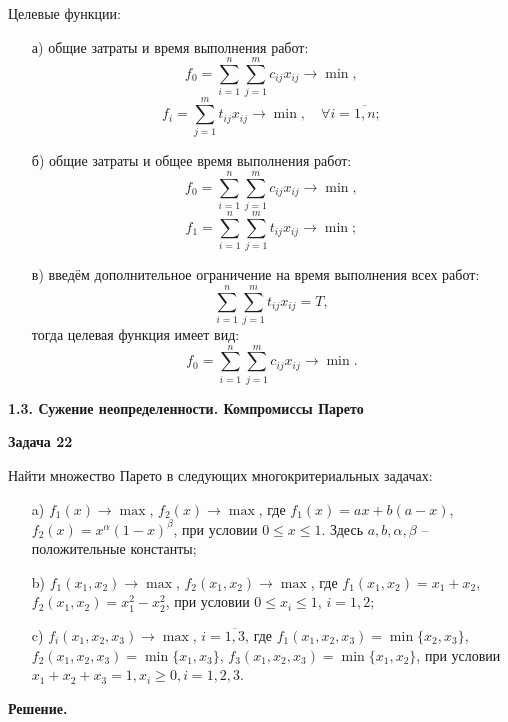 \documentclass[a4paper,14pt]{extreport}
\begin{document}
Целевые функции:
\begin{itemize}
	\item[а)] общие затраты и время выполнения работ:
$$
	f_0 = \sum_{i=1}^n \sum_{j=1}^m c_{ij} x_{ij} \to \min,
$$ $$
	f_i = \sum_{j=1}^m t_{ij} x_{ij} \to \min, \quad \forall i=\overline{1, n};
$$

	\item[б)] общие затраты и общее время выполнения работ:
$$
	f_0 = \sum_{i=1}^n \sum_{j=1}^m c_{ij} x_{ij} \to \min,
$$ $$
	f_1 = \sum_{i=1}^n \sum_{j=1}^m t_{ij} x_{ij} \to \min;
$$

	\item[в)] введём дополнительное ограничение на время выполнения всех работ:
$$
	\sum_{i=1}^n \sum_{j=1}^m t_{ij} x_{ij} = T,
$$
тогда целевая функция имеет вид:
$$
	f_0 = \sum_{i=1}^n \sum_{j=1}^m c_{ij}x_{ij} \to \min.
$$
\end{itemize}

\begin{center}
	\textbf{1.3. Сужение неопределенности. Компромиссы Парето}
\end{center}

\textbf{Задача 22}

Найти множество Парето в следующих многокритериальных задачах:
\begin{itemize}
	\item[a)] $f_1(x) \to \max$, $f_2(x) \to \max$, где $f_1(x) = ax+b(a-x)$, $f_2(x) = x^{\alpha}(1-x)^{\beta}$, при условии $0 \le x \le 1$. Здесь $a, b, \alpha, \beta$ -- положительные константы;

	\item[b)] $f_1(x_1, x_2) \to \max$, $f_2(x_1, x_2) \to \max$, где $f_1(x_1, x_2) = x_1 + x_2$, $f_2(x_1, x_2) = x_1^2 - x_2^2$, при условии $0 \le x_i \le 1$, $i = 1,2$;

	\item[c)] $f_i(x_1, x_2, x_3) \to \max$, $i=\overline{1, 3}$, где $f_1(x_1, x_2, x_3) = \min\{x_2, x_3\}$, $f_2(x_1, x_2, x_3) = \min\{x_1, x_3\}$, $f_3(x_1, x_2, x_3) = \min\{x_1, x_2\}$, при условии $x_1 + x_2 + x_3 = 1, x_i \ge 0, i = 1,2,3$.
\end{itemize}

\textbf{Решение.} 
\end{document}
